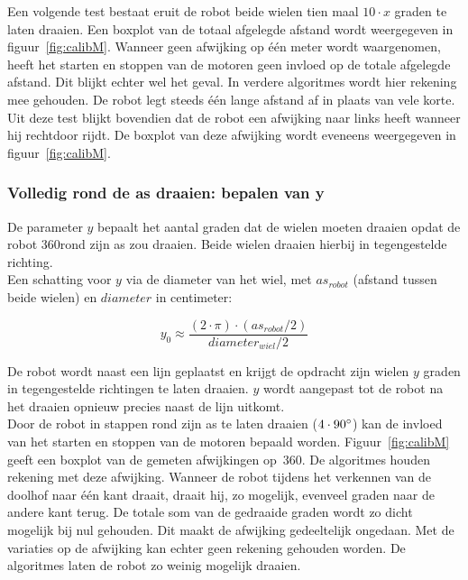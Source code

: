 \documentclass[eind]{penoverslag}
\begin{document}
Een volgende test bestaat eruit de robot beide wielen tien maal $10 \cdot x$ graden te laten draaien. Een boxplot van de totaal afgelegde afstand wordt weergegeven in figuur~\ref{fig:calibM}. Wanneer geen afwijking op \'e\'en meter wordt waargenomen, heeft het starten en stoppen van de motoren geen invloed op de totale afgelegde afstand. Dit blijkt echter wel het geval. In verdere algoritmes wordt hier rekening mee gehouden. De robot legt steeds \'e\'en lange afstand af in plaats van vele korte.\\
Uit deze test blijkt bovendien dat de robot een afwijking naar links heeft wanneer hij rechtdoor rijdt. De boxplot van deze afwijking wordt eveneens weergegeven in figuur~\ref{fig:calibM}.


\subsubsection{Volledig rond de as draaien: bepalen van y} %
\label{ssec:calibMy}
De parameter $y$ bepaalt het aantal graden dat de wielen moeten draaien opdat de robot 360\degree rond zijn as zou draaien. Beide wielen draaien hierbij in tegengestelde richting.\\
Een schatting voor $y$ via de diameter van het wiel, met $as_{robot}$ (afstand tussen beide wielen) en $diameter$ in centimeter:

\begin{equation*}
y_{0} \approx \frac{(2 \cdot \pi) \cdot (as_{robot}/2)}{diameter_{wiel}/2}
\end{equation*}

De robot wordt naast een lijn geplaatst en krijgt de opdracht zijn wielen $y$ graden in tegengestelde richtingen te laten draaien. $y$ wordt aangepast tot de robot na het draaien opnieuw precies naast de lijn uitkomt.\\


Door de robot in stappen rond zijn as te laten draaien ($4 \cdot 90\degree$) kan de invloed van het starten en stoppen van de motoren bepaald worden. Figuur~\ref{fig:calibM} geeft een boxplot van de gemeten afwijkingen op~360\degree. De algoritmes houden rekening met deze afwijking. Wanneer de robot tijdens het verkennen van de doolhof naar \'e\'en kant draait, draait hij, zo mogelijk, evenveel graden naar de andere kant terug. De totale som van de gedraaide graden wordt zo dicht mogelijk bij nul gehouden. Dit maakt de afwijking gedeeltelijk ongedaan. Met de variaties op de afwijking kan echter geen rekening gehouden worden. De algoritmes laten de robot zo weinig mogelijk draaien.
\end{document}

